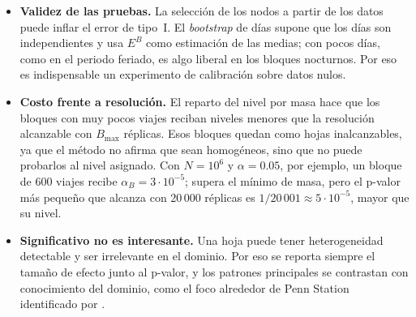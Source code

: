 \begin{itemize}
  $K_T=4$ grupos de tres columnas, un corte de filas en un único bloque añade
  $|J|-1=2$ parámetros, mientras que partir globalmente el mismo grupo de filas a
  lo largo de los cuatro grupos de columnas añade $4\cdot2=8$.
  \item \textbf{Validez de las pruebas.} La selección de los nodos a partir de
  los datos puede inflar el error de tipo~I. El \emph{bootstrap} de días supone que
  los días son independientes y usa $E^B$ como estimación de las medias; con
  pocos días, como en el periodo feriado, es algo liberal en los bloques
  nocturnos. Por eso es indispensable un experimento de calibración sobre datos
  nulos.
  \item \textbf{Costo frente a resolución.} El reparto del nivel por masa hace
  que los bloques con muy pocos viajes reciban niveles menores que la
  resolución alcanzable con $B_{\max}$ réplicas. Esos bloques quedan como hojas
  inalcanzables, ya que el método no afirma que sean homogéneos, sino que no puede
  probarlos al nivel asignado. Con $N=10^6$ y $\alpha=0.05$, por ejemplo, un
  bloque de 600 viajes recibe $\alpha_B=3\cdot10^{-5}$; supera el mínimo de masa,
  pero el p-valor más pequeño que alcanza con 20\,000 réplicas es
  $1/20\,001\approx5\cdot10^{-5}$, mayor que su nivel.
  \item \textbf{Significativo no es interesante.} Una hoja puede tener
  heterogeneidad detectable y ser irrelevante en el dominio. Por eso se reporta
  siempre el tamaño de efecto junto al p-valor, y los patrones principales se
  contrastan con conocimiento del dominio, como el foco alrededor de Penn
  Station identificado por \citet{Liu2021}.
\end{itemize}

